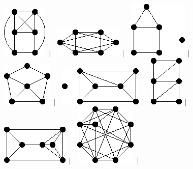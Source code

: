 \documentclass[11pt,paper=b5,footinclude,headinclude]{scrbook} %
\newtheorem{ex}{Vaja\hypertarget{sol:\theex}}[chapter]
\begin{document}
\begin{ex}
\begin{figure}
\includegraphics[scale=0.5]{smallGraphs/g_co-2P3.png}$\,\mid\,$\
\includegraphics[scale=0.5]{smallGraphs/g_co-3K2.png}$\,\mid\,$\
\includegraphics[scale=0.5]{smallGraphs/g_co-4fan.png}$\,\mid\,$\
\includegraphics[scale=0.5]{smallGraphs/g_co-5pan.png}$\,\mid\,$\
\includegraphics[scale=0.5]{smallGraphs/g_co-6fan.png}$\,\mid\,$\
\includegraphics[scale=0.5]{smallGraphs/g_co-A.png}$\,\mid\,$\
\includegraphics[scale=0.5]{smallGraphs/g_co-BW3.png}$\,\mid\,$\
\includegraphics[scale=0.5]{smallGraphs/g_co-BW4.png}$\,\mid\,$\

\end{figure}
\end{ex}
\end{document}
